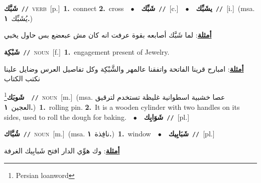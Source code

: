 \documentclass[10pt,a4paper,twoside]{article} %
\begin{document}
\begin{multicols}{2}
{\setlength\topsep{0pt}\textbf{\foreignlanguage{arabic}{شَبَّك}}\ {\color{gray}\texttt{//}\color{black}}\ \textsc{verb}\ [p.]\ \textbf{1.}~connect  \textbf{2.}~cross\ \ $\bullet$\ \ \setlength\topsep{0pt}\textbf{\foreignlanguage{arabic}{شَبِّك}}\ {\color{gray}\texttt{//}\color{black}}\ [c.]\ \ $\bullet$\ \ \setlength\topsep{0pt}\textbf{\foreignlanguage{arabic}{يشَبِّك}}\ {\color{gray}\texttt{//}\color{black}}\ [i.]\ \color{gray}(msa. \foreignlanguage{arabic}{يُشَبِّك}~\foreignlanguage{arabic}{\textbf{١.}})\color{black}\  \begin{flushright}\color{gray}\foreignlanguage{arabic}{\textbf{\underline{\foreignlanguage{arabic}{أمثلة}}}: لما شَبَّك أصابعه بقوة عرفت انه كان مش عبعضع بس حاول يخبي}\end{flushright}\color{black}} \vspace{2mm}

{\setlength\topsep{0pt}\textbf{\foreignlanguage{arabic}{شَبْكِة}}\ {\color{gray}\texttt{//}\color{black}}\ \textsc{noun}\ [f.]\ \textbf{1.}~engagement present of Jewelry.\  \begin{flushright}\color{gray}\foreignlanguage{arabic}{\textbf{\underline{\foreignlanguage{arabic}{أمثلة}}}: امبارح قرينا الفاتحة واتفقنا عالمهر والشَّبْكِة وكل تفاصيل العرس وضايل علينا نكتب الكتاب}\end{flushright}\color{black}} \vspace{2mm}

{\setlength\topsep{0pt}\textbf{\foreignlanguage{arabic}{شَوبَك}}\footnote{Persian loanword}\ \ {\color{gray}\texttt{//}\color{black}}\ \textsc{noun}\ [m.]\ \color{gray}(msa. \foreignlanguage{arabic}{عصا خشبية اسطوانية غليظة تستخدم لترقيق العجين}~\foreignlanguage{arabic}{\textbf{١.}})\color{black}\ \textbf{1.}~rolling pin.  \textbf{2.}~It is a wooden cylinder with two handles on its sides, used to roll the dough for baking.\ \ $\bullet$\ \ \setlength\topsep{0pt}\textbf{\foreignlanguage{arabic}{شَوَابِك}}\ {\color{gray}\texttt{//}\color{black}}\ [pl.]\ } \vspace{2mm}

{\setlength\topsep{0pt}\textbf{\foreignlanguage{arabic}{شُبَّاك}}\ {\color{gray}\texttt{//}\color{black}}\ \textsc{noun}\ [m.]\ \color{gray}(msa. \foreignlanguage{arabic}{نافِذة}~\foreignlanguage{arabic}{\textbf{١.}})\color{black}\ \textbf{1.}~window\ \ $\bullet$\ \ \setlength\topsep{0pt}\textbf{\foreignlanguage{arabic}{شَبَابِيك}}\ {\color{gray}\texttt{//}\color{black}}\ [pl.]\  \begin{flushright}\color{gray}\foreignlanguage{arabic}{\textbf{\underline{\foreignlanguage{arabic}{أمثلة}}}: وك هوِّي الدار افتح شَبابِيك الغرفة}\end{flushright}\color{black}} \vspace{2mm}


\end{multicols}
\end{document}
